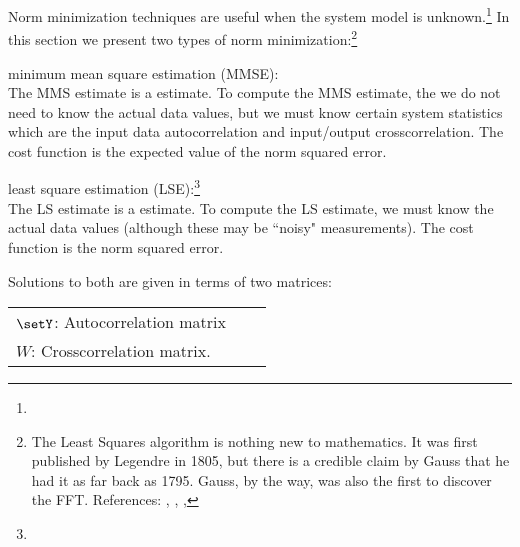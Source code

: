 Norm minimization techniques are useful when the system model is unknown.\footnote{}
In this section we present two types of norm minimization:\footnote{
   The Least Squares algorithm is nothing new to mathematics.
   It was first published by Legendre in 1805, but there is a credible claim by Gauss
   that he had it as far back as 1795.
   Gauss, by the way, was also the first to discover the FFT.
   References:
   ,
   ,
   ,
   }

\begin{enume}
  \item minimum mean square estimation (MMSE): \\
        The MMS estimate is a  estimate.
        To compute the MMS estimate, the we do not need to know
        the actual data values, but we must know certain system statistics
        which are the
        input data autocorrelation and input/output crosscorrelation.
        The cost function is the expected value of the norm squared error.
   \item least square estimation (LSE):\footnote{} \\
        The LS estimate is a  estimate.
        To compute the LS estimate, we must know the actual data values
        (although these may be ``noisy" measurements).
        The cost function is the norm squared error.
\end{enume}

Solutions to both are given in terms of two matrices:

\begin{tabular}{lll}
   $\setY$: Autocorrelation matrix \\
   $W$: Crosscorrelation matrix.
\end{tabular}

